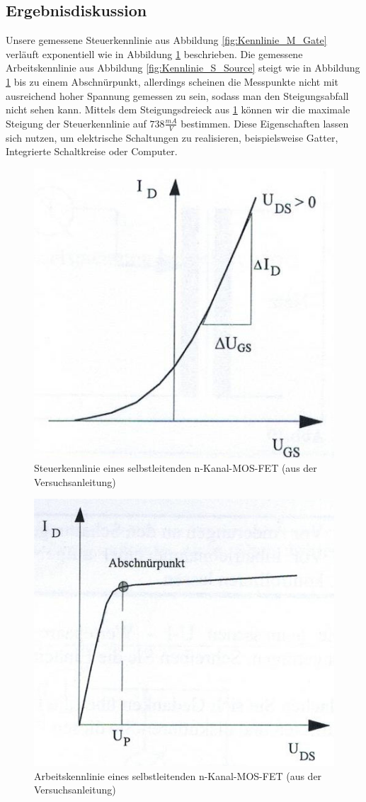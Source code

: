 \documentclass{scrartcl}
\begin{document}
\subsection{Ergebnisdiskussion}
Unsere gemessene Steuerkennlinie aus Abbildung \ref{fig:Kennlinie_M_Gate} verläuft exponentiell wie in Abbildung \ref{fig:Kennlinie_Gate} beschrieben. Die gemessene Arbeitskennlinie aus Abbildung \ref{fig:Kennlinie_S_Source} steigt wie in Abbildung \ref{fig:Kennlinie_Gate} bis zu einem Abschnürpunkt, allerdings scheinen die Messpunkte nicht mit ausreichend hoher Spannung gemessen zu sein, sodass man den Steigungsabfall nicht sehen kann.
Mittels dem Steigungsdreieck aus \ref{fig:Kennlinie_Gate} können wir die maximale Steigung der Steuerkennlinie auf $738\frac{mA}{V}$ bestimmen. Diese Eigenschaften lassen sich nutzen, um elektrische Schaltungen zu realisieren, beispielsweise Gatter, Integrierte Schaltkreise oder Computer. 
\begin{figure}[H]
  \centering
    \includegraphics[scale=0.75]{Kennlinie_Gate.JPG}
  \caption{Steuerkennlinie eines selbstleitenden n-Kanal-MOS-FET (aus der Versuchsanleitung)}
  \label{fig:Kennlinie_Gate}
\end{figure}

\begin{figure}[H]
  \centering
    \includegraphics[scale=0.75]{Kennlinie_Drain.JPG}
  \caption{Arbeitskennlinie eines selbstleitenden n-Kanal-MOS-FET (aus der Versuchsanleitung)}
  \label{fig:Kennlinie_Drain}
\end{figure}
\end{document}
